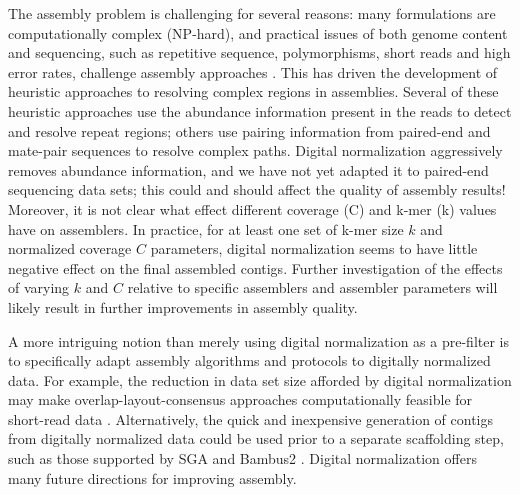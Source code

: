 The assembly problem is challenging for several reasons: many
formulations are computationally complex (NP-hard), and practical
issues of both genome content and sequencing, such as repetitive
sequence, polymorphisms, short reads and high error rates, challenge
assembly approaches \cite{pubmed19580519}.  This has driven the
development of heuristic approaches to resolving complex regions in
assemblies.  Several of these heuristic approaches use the abundance
information present in the reads to detect and resolve repeat regions;
others use pairing information from paired-end and mate-pair sequences
to resolve complex paths.  Digital normalization aggressively removes
abundance information, and we have not yet adapted it to paired-end
sequencing data sets; this could and should affect the quality of
assembly results! Moreover, it is not clear what effect different
coverage (C) and k-mer (k) values have on assemblers.  In practice,
for at least one set of k-mer size $k$ and normalized coverage $C$
parameters, digital normalization seems to have little negative effect
on the final assembled contigs.  Further investigation of the effects
of varying $k$ and $C$ relative to specific assemblers and assembler
parameters will likely result in further improvements in assembly
quality.

%

A more intriguing notion than merely using digital normalization as a
pre-filter is to specifically adapt assembly algorithms and protocols
to digitally normalized data.  For example, the reduction in data set
size afforded by digital normalization may make
overlap-layout-consensus approaches computationally feasible for
short-read data \cite{pubmed20211242}.  Alternatively, the quick and
inexpensive generation of contigs from digitally normalized data could
be used prior to a separate scaffolding step, such as those supported
by SGA and Bambus2 \cite{pubmed20529929,pubmed21926123}.  Digital
normalization offers many future directions for improving assembly.

